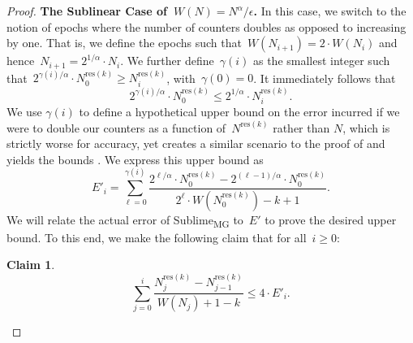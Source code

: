 \documentclass[sigconf]{acmart}
\newtheorem{claim}[theorem]{Claim}
\newcommand{\sketch}{Sublime}
\newcommand{\sketchmg}{\sketch\textsubscript{MG}\xspace}
\newcommand{\parentheses}[1]{\left(#1\right)}
\begin{document}
\begin{proof}
    \medskip\noindent
    \textbf{The Sublinear Case of~$W(N)=N^{\alpha}/\epsilon$.}
    In this case, we switch to the notion of epochs where the number of
    counters doubles as opposed to increasing by one. That is, we define the
    epochs such that~$W(N_{i+1}) = 2\cdot W(N_i)$ and hence~$N_{i+1} =
    2^{1/\alpha} \cdot N_i$. We further define~$\gamma(i)$ as the smallest
    integer such that~$2^{\gamma(i)/\alpha}\cdot N^{\text{res}(k)}_0 \geq
    N^{\text{res}(k)}_i$, with~$\gamma(0)=0$. It immediately follows that
    $$ 2^{\gamma(i)/\alpha}\cdot N^{\text{res}(k)}_0 \leq 2^{1/\alpha} \cdot N^{\text{res}(k)}_i. $$
    We use $\gamma(i)$ to define a hypothetical upper bound on the error
    incurred if we were to double our counters as a function
    of~$N^{\text{res}(k)}$ rather than $N$, which is strictly worse for
    accuracy, yet creates a similar scenario to the proof of
     and yields the bounds . We express
    this upper bound as
    $$ E'_i = \sum_{\ell=0}^{\gamma(i)} \frac{2^{\ell/\alpha} \cdot N^{\text{res}(k)}_0 - 2^{(\ell-1)/\alpha} \cdot N^{\text{res}(k)}_0}{2^{\ell} \cdot W\parentheses{N^{\text{res}(k)}_0 }-k+1}. $$
    We will relate the actual error of \sketchmg to~$E'$ to prove the desired
    upper bound. To this end, we make the following claim that for all~$i \geq
    0$:
    \begin{claim}
        \label{claim:ms-major}
        $$ \sum_{j=0}^i  \frac{N^{\text{res}(k)}_j- N^{\text{res}(k)}_{j-1}}{W(N_j)+1-k} \leq 4\cdot E'_i. $$
    \end{claim}	


\end{proof}
\end{document}
